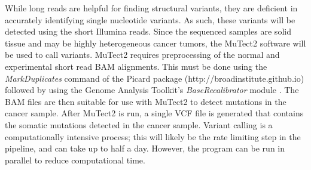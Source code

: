 While long reads are helpful for finding structural variants, they are deficient in accurately identifying single nucleotide variants. As such, these variants will be detected using the short Illumina reads. Since the sequenced samples are solid tissue and may be highly heterogeneous cancer tumors, the MuTect2 \parencite{cibulskis_sensitive_2013} software will be used to call variants.
MuTect2 requires preprocessing of the normal and experimental short read BAM alignments.
This must be done using the \textit{MarkDuplicates} command of the Picard package (http://broadinstitute.github.io) followed by using the Genome Analysis Toolkit's \textit{BaseRecalibrator} module \parencite{mckenna_genome_2010}.
The BAM files are then suitable for use with MuTect2 to detect mutations in the cancer sample. After MuTect2 is run, a single VCF file is generated that contains the somatic mutations detected in the cancer sample.
Variant calling is a computationally intensive process; this will likely be the rate limiting step in the pipeline, and can take up to half a day. However, the program can be run in parallel to reduce computational time.

